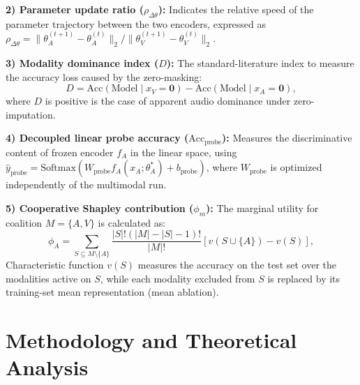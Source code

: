 \documentclass[conference]{IEEEtran}
\begin{document}
\textbf{2) Parameter update ratio ($\rho_{\Delta\theta}$):} Indicates the relative speed of the parameter trajectory between the two encoders, expressed as $\rho_{\Delta\theta} = \|\theta_A^{(t+1)} - \theta_A^{(t)}\|_2 / \|\theta_V^{(t+1)} - \theta_V^{(t)}\|_2$.

\textbf{3) Modality dominance index ($D$):} The standard-literature index to measure the accuracy loss caused by the zero-masking:
\begin{equation}
    D = \text{Acc}(\text{Model} \mid x_V = \mathbf{0}) - \text{Acc}(\text{Model} \mid x_A = \mathbf{0}),
    \label{eq:dominance_index}
\end{equation}
where $D$ is positive is the case of apparent audio dominance under zero-imputation.

\textbf{4) Decoupled linear probe accuracy ($\text{Acc}_{\text{probe}}$):} Measures the discriminative content of frozen encoder $f_A$ in the linear space, using $\hat{y}_{\text{probe}} = \text{Softmax}(W_{\text{probe}} f_A(x_A; \theta_A^*) + b_{\text{probe}})$, where $W_{\text{probe}}$ is optimized independently of the multimodal run.

\textbf{5) Cooperative Shapley contribution ($\phi_m$):} The marginal utility for coalition $M = \{A, V\}$ is calculated as:
\begin{equation}
    \phi_A = \sum_{S \subseteq M \setminus \{A\}} \frac{|S|!(|M| - |S| - 1)!}{|M|!} [v(S \cup \{A\}) - v(S)],
    \label{eq:shapley}
\end{equation}
Characteristic function $v(S)$ measures the accuracy on the test set over the modalities active on $S$, while each modality excluded from $S$ is replaced by its training-set mean representation (mean ablation).

\section{Methodology and Theoretical Analysis}
\end{document}
